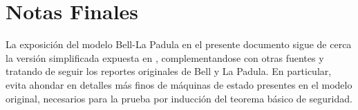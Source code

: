 \documentclass[main.tex]{subfiles}
\begin{document}
\section*{Notas Finales}
La exposición del modelo Bell-La Padula en el presente documento sigue de cerca
la versión simplificada expuesta en \cite{Bishop}, complementandose con otras
fuentes \cite{g11, a08, t11} y tratando de seguir los reportes originales de Bell y
La Padula. En particular, evita ahondar en detalles más finos de máquinas de
estado presentes en el modelo original, necesarios para la prueba por inducción
del teorema básico de seguridad.


\iffalse
\section{Biba: Modelo de Integridad}
\subsection{Low-water mark}
\subsection{Política Anillo}
\subsection{Integridad Estricta}
\section{Muralla China: Modelo híbrido}
\fi



\end{document}
